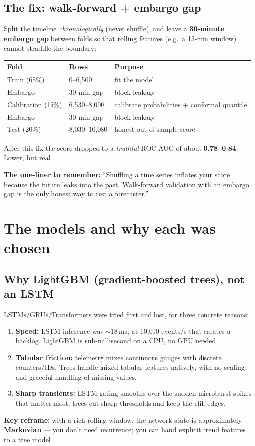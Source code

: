 \documentclass[11pt,a4paper]{article}
\newcommand{\note}[1]{%
  \par\vspace{3pt}\noindent
  \colorbox{soft}{\parbox{\dimexpr\linewidth-2\fboxsep}{\small #1}}%
  \par\vspace{3pt}}
\begin{document}
\subsection{The fix: walk-forward + embargo gap}
Split the timeline \emph{chronologically} (never shuffle), and leave a \textbf{30-minute embargo gap} between
folds so that rolling features (e.g.\ a 15-min window) cannot straddle the boundary:
\begin{center}
\begin{tabularx}{\linewidth}{@{}p{3.3cm}p{3.1cm}X@{}}
\toprule
\textbf{Fold} & \textbf{Rows} & \textbf{Purpose} \\
\midrule
Train (65\%) & 0--6{,}500 & fit the model \\
Embargo & 30 min gap & block leakage \\
Calibration (15\%) & 6{,}530--8{,}000 & calibrate probabilities + conformal quantile \\
Embargo & 30 min gap & block leakage \\
Test (20\%) & 8{,}030--10{,}080 & honest out-of-sample score \\
\bottomrule
\end{tabularx}
\end{center}
After this fix the score dropped to a \emph{truthful} ROC-AUC of about \textbf{0.78--0.84}. Lower, but real.

\note{\textbf{The one-liner to remember:} ``Shuffling a time series inflates your score because the future
leaks into the past. Walk-forward validation with an embargo gap is the only honest way to test a forecaster.''}

\section{The models and why each was chosen}
\subsection{Why LightGBM (gradient-boosted trees), not an LSTM}
LSTMs/GRUs/Transformers were tried first and lost, for three concrete reasons:
\begin{enumerate}
  \item \textbf{Speed:} LSTM inference was $\sim$18\,ms; at 10{,}000 events/s that creates a backlog.
  LightGBM is sub-millisecond on a CPU, no GPU needed.
  \item \textbf{Tabular friction:} telemetry mixes continuous gauges with discrete counters/IDs. Trees handle
  mixed tabular features natively, with no scaling and graceful handling of missing values.
  \item \textbf{Sharp transients:} LSTM gating smooths over the sudden microburst spikes that matter most;
  trees cut sharp thresholds and keep the cliff edges.
\end{enumerate}
\textbf{Key reframe:} with a rich rolling window, the network state is approximately \textbf{Markovian} ---
you don't need recurrence; you can hand explicit trend features to a tree model.
\end{document}
